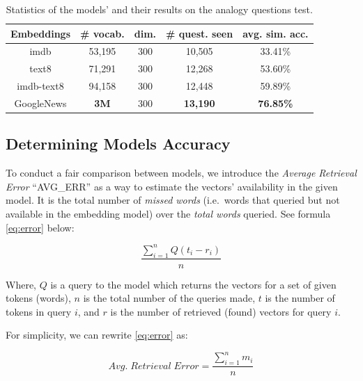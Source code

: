 \documentclass[11pt,letterpaper]{article}
\begin{document}
\begin{table}[ht]
\centering
\footnotesize

\begin{tabular}{@{}ccccc@{}}
\toprule

Embeddings & \# vocab. & dim. & \# quest. seen & avg. sim.
acc. \\\midrule

imdb & 53,195 & 300 & 10,505 & 33.41\% \\
text8 & 71,291 & 300 & 12,268 & 53.60\% \\
imdb-text8 & 94,158 & 300 & 12,448 & 59.89\% \\
GoogleNews & \textbf{3M} & 300 & \textbf{13,190} & \textbf{76.85\%} \\

\bottomrule
\end{tabular}

\caption{Statistics of the models' and their results on the analogy
questions test. \label{tbl:embed_stats}}

\end{table}

\subsection{Determining Models
Accuracy}\label{determining-models-accuracy}

To conduct a fair comparison between models, we introduce the
\emph{Average Retrieval Error} ``AVG\_ERR'' as a way to estimate the
vectors' availability in the given model. It is the total number of
\emph{missed words} (i.e.~words that queried but not available in the
embedding model) over the \emph{total words} queried. See formula
\ref{eq:error} below:

\begin{equation}\frac{ \sum_{i=1}^{n}Q({t_i - r_i})}{ n }\label{eq:error}\end{equation}

Where, \(Q\) is a query to the model which returns the vectors for a set
of given tokens (words), \(n\) is the total number of the queries made,
\(t\) is the number of tokens in query \(i\), and \(r\) is the number of
retrieved (found) vectors for query \(i\).

For simplicity, we can rewrite \ref{eq:error} as:

\begin{equation}Avg.\;Retrieval\;Error = \frac{ \sum_{i=1}^n{m_i} } { n }\label{eq:avg_error}\end{equation}
\end{document}
